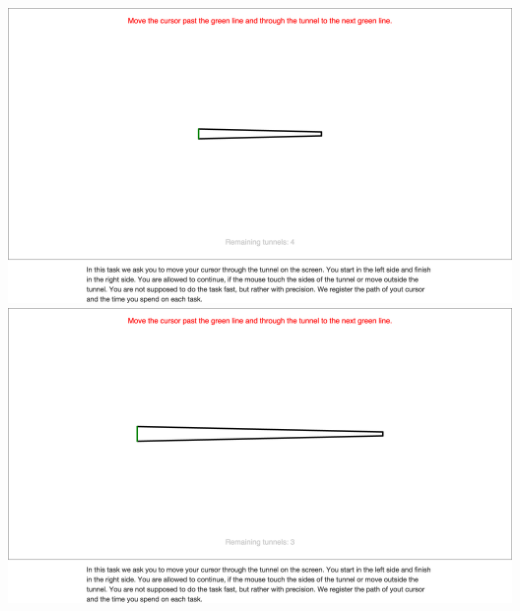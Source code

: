 \begin{appendices}
\begin{minipage}{\textwidth}
\centering
\includegraphics[width=\textwidth]{images/screenshots/ex_step_4_tunnel_1}
\label{fig:ex_step_4_tunnel_1}
\includegraphics[width=\textwidth]{images/screenshots/ex_step_4_tunnel_2}
\label{fig:ex_step_4_tunnel_2}
\end{minipage}


\end{appendices}
